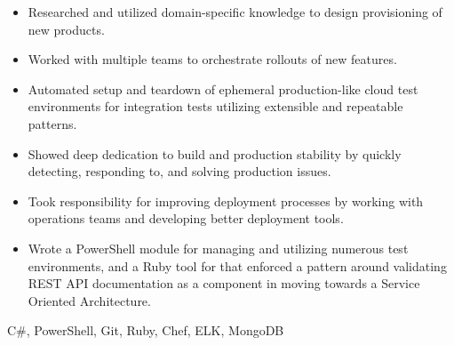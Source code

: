 \begin{experiences}
{\begin{itemize}
                        \item Researched and utilized domain-specific knowledge to design provisioning of new products.
                        \item Worked with multiple teams to orchestrate rollouts of new features.
                        \item Automated setup and teardown of ephemeral production-like cloud test environments for integration tests utilizing extensible and repeatable patterns.
                        \item Showed deep dedication to build and production stability by quickly detecting, responding to, and solving production issues.
                        \item Took responsibility for improving deployment processes by working with operations teams and developing better deployment tools.
                        \item Wrote a PowerShell module for managing and utilizing numerous test environments, and a Ruby tool for that enforced a pattern around validating REST API documentation as a component in moving towards a Service Oriented Architecture.
                      \end{itemize}
                    }
                    {C\#, PowerShell, Git, Ruby, Chef, ELK, MongoDB}
\end{experiences}
